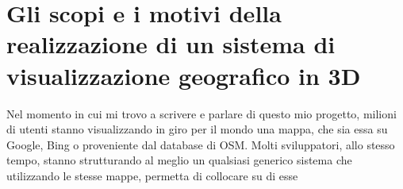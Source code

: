 \section{Gli scopi e i motivi della realizzazione di un sistema di visualizzazione geografico in 3D}
Nel momento in cui mi trovo a scrivere e parlare di questo mio progetto, milioni di utenti stanno visualizzando in giro per il mondo una mappa, che sia essa su Google, Bing o proveniente dal database di OSM. Molti sviluppatori, allo stesso tempo, stanno strutturando al meglio un qualsiasi generico sistema che utilizzando le stesse mappe, permetta di collocare su di esse
